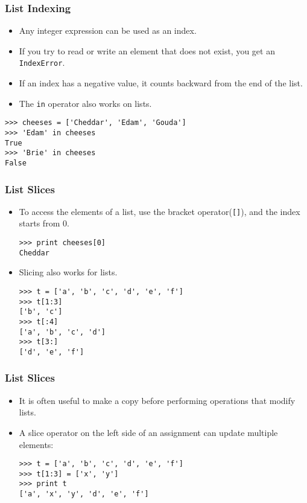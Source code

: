 \documentclass{beamer}
\newcommand{\beforeverb}{\footnotesize}
\newcommand{\afterverb}{\normalsize}
\begin{document}
\begin{frame}[fragile]
\frametitle{List Indexing}
\begin{itemize}

\item Any \alert{integer expression} can be used as an index.

\item If you try to read or write an element that does not exist, you
get an {\tt IndexError}.

\item If an index has a \alert{negative value}, it counts \alert{backward} from the
end of the list.


\item The {\tt in} operator also works on lists.
\end{itemize}
\begin{block}{}
\beforeverb
\begin{verbatim}
>>> cheeses = ['Cheddar', 'Edam', 'Gouda']
>>> 'Edam' in cheeses
True
>>> 'Brie' in cheeses
False
\end{verbatim}
\afterverb
\end{block}
\end{frame}
\begin{frame}[fragile]
\frametitle{List Slices}
\begin{itemize}
\item To access the elements of a list, use the bracket operator(\verb"[]"), and the index starts from 0.
\beforeverb
\begin{verbatim}
>>> print cheeses[0]
Cheddar
\end{verbatim}
\item Slicing also works for lists.
\begin{verbatim}
>>> t = ['a', 'b', 'c', 'd', 'e', 'f']
>>> t[1:3]
['b', 'c']
>>> t[:4]
['a', 'b', 'c', 'd']
>>> t[3:]
['d', 'e', 'f']
\end{verbatim}
\normalsize
\end{itemize} 
\end{frame}

\begin{frame}[fragile]
\frametitle{List Slices}
\begin{itemize}
\item  It is often useful to make a copy
before performing operations that modify
lists.
\item A slice operator on the left side of an assignment
can update multiple elements:
\beforeverb
\begin{verbatim}
>>> t = ['a', 'b', 'c', 'd', 'e', 'f']
>>> t[1:3] = ['x', 'y']
>>> print t
['a', 'x', 'y', 'd', 'e', 'f']
\end{verbatim}
\afterverb
\end{itemize}
\end{frame}
\end{document}
